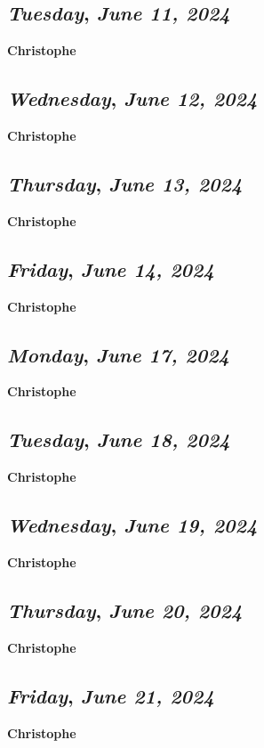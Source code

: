 \def\day{\textit{June 11, 2024}}
\def\weekday{\textit{Tuesday}}
\subsection*{\weekday, \day}
\textbf {Christophe}

\def\day{\textit{June 12, 2024}}
\def\weekday{\textit{Wednesday}}
\subsection*{\weekday, \day}
\textbf {Christophe}

\def\day{\textit{June 13, 2024}}
\def\weekday{\textit{Thursday}}
\subsection*{\weekday, \day}
\textbf {Christophe}

\def\day{\textit{June 14, 2024}}
\def\weekday{\textit{Friday}}
\subsection*{\weekday, \day}
\textbf {Christophe}

\def\day{\textit{June 17, 2024}}
\def\weekday{\textit{Monday}}
\subsection*{\weekday, \day}
\textbf {Christophe}

\def\day{\textit{June 18, 2024}}
\def\weekday{\textit{Tuesday}}
\subsection*{\weekday, \day}
\textbf {Christophe}

\def\day{\textit{June 19, 2024}}
\def\weekday{\textit{Wednesday}}
\subsection*{\weekday, \day}
\textbf {Christophe}

\def\day{\textit{June 20, 2024}}
\def\weekday{\textit{Thursday}}
\subsection*{\weekday, \day}
\textbf {Christophe}

\def\day{\textit{June 21, 2024}}
\def\weekday{\textit{Friday}}
\subsection*{\weekday, \day}
\textbf {Christophe}

